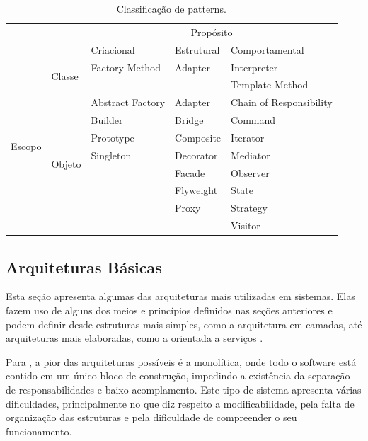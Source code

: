 \documentclass[diss]{template/setrem}
\begin{document}
\begin{table}[!h]
	\begin{center}
	\small
    \begin{tabular}{ | l | l | l | l | l |}
    \hline
	\multicolumn{2}{|c|}{} & \multicolumn{3}{|c|}{Propósito} \\ \cline{3-5}
    \multicolumn{2}{|c|}{} & Criacional & Estrutural & Comportamental \\ \hline
    \multirow{11}{*}{Escopo} & \multirow{2}{*}{Classe} & Factory Method & Adapter & Interpreter \\
    & & & & Template Method \\ \cline{2-5}
    & \multirow{9}{*}{Objeto} & Abstract Factory & Adapter & Chain of Responsibility \\
    & & Builder & Bridge & Command \\
    & & Prototype & Composite & Iterator \\
    & & Singleton & Decorator & Mediator \\
    & & & Facade & Observer \\
    & & & Flyweight & State \\
    & & & Proxy & Strategy \\
    & & & & Visitor \\
    \hline
    \end{tabular}
    \end{center}
    \caption{Classificação de patterns.}
    \label{tab:patterns}
\end{table}

\subsection{Arquiteturas Básicas}
Esta seção apresenta algumas das arquiteturas mais utilizadas em sistemas. Elas fazem uso de alguns dos meios e princípios definidos nas seções anteriores e podem definir desde estruturas mais simples, como a arquitetura em camadas, até arquiteturas mais elaboradas, como a orientada a serviços \citep{Vogel2011}.

Para \citet{Vogel2011}, a pior das arquiteturas possíveis é a monolítica, onde todo o software está contido em um único bloco de construção, impedindo a existência da separação de responsabilidades e baixo acomplamento. Este tipo de sistema apresenta várias dificuldades, principalmente no que diz respeito a modificabilidade, pela falta de organização das estruturas e pela dificuldade de compreender o seu funcionamento.
\end{document}
